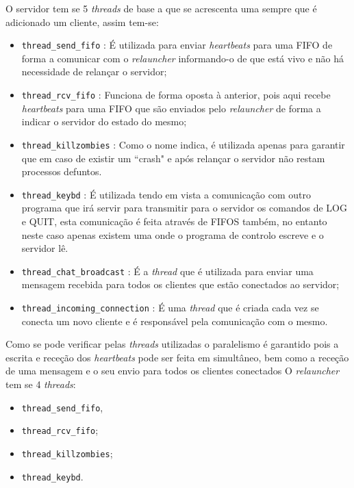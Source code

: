 \documentclass[a4paper]{article}
\begin{document}
	O servidor tem se 5 \textit{threads} de base a que se acrescenta uma sempre que é adicionado um cliente, assim tem-se:

	\begin{itemize}
		\item \texttt{thread\_send\_fifo} : É utilizada para enviar \textit{heartbeats} para uma FIFO de forma a comunicar com o \textit{relauncher} informando-o de que está vivo e não há necessidade de relançar o servidor; 
		\item \texttt{thread\_rcv\_fifo} : Funciona de forma oposta à anterior, pois aqui recebe \textit{heartbeats} para uma FIFO que são enviados pelo \textit{relauncher} de forma a indicar o servidor do estado do mesmo; 
		\item \texttt{thread\_killzombies} : Como o nome indica, é utilizada apenas para garantir que em caso de existir um ``crash" e após relançar o servidor não restam processos defuntos. 
		\item \texttt{thread\_keybd} : É utilizada tendo em vista a comunicação com outro programa que irá servir para transmitir para o servidor os comandos de LOG e QUIT, esta comunicação é feita através de FIFOS também, no entanto neste caso apenas existem uma onde o programa de controlo escreve e o servidor lê. 
		\item \texttt{thread\_chat\_broadcast} : É a \textit{thread} que é utilizada para enviar uma mensagem recebida para todos os clientes que estão conectados ao servidor; 
		\item \texttt{thread\_incoming\_connection} : É uma \textit{thread} que é criada cada vez se conecta um novo cliente e é responsável pela comunicação com o mesmo. 
	\end{itemize}

	Como se pode verificar pelas \textit{threads} utilizadas o paralelismo é garantido pois a escrita e receção dos \textit{heartbeats} pode ser feita em simultâneo, bem como a receção de uma mensagem e o seu envio para todos os clientes conectados 
	O \textit{relauncher} tem se 4 \textit{threads}: 

	\begin{itemize}
		\item \texttt{thread\_send\_fifo}, 
		\item \texttt{thread\_rcv\_fifo}; 
		\item \texttt{thread\_killzombies}; 
		\item \texttt{thread\_keybd}. 
	\end{itemize}
\end{document}

